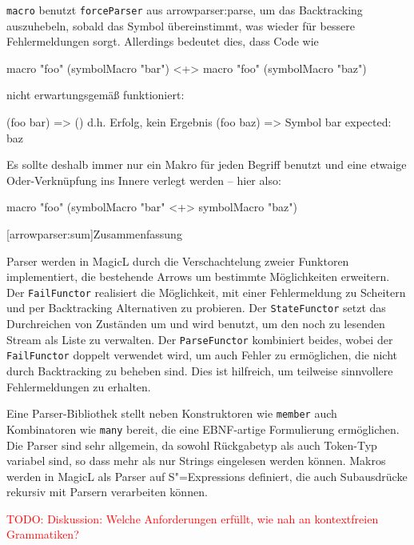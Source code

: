 \documentclass[11pt, a4paper, bibgerm]{scrbook}
\newenvironment{DIFnomarkup}{}{}
\newcommand\icode[1]{\lstinline?#1?}
\newcommand{\todo}[1]{
  \textcolor{red}{TODO: #1}
}
\newcommand\lsection{}
\newcommand\sref{}
\newcommand{\sexps}{S"=Expressions}
\begin{document}
\icode{macro} benutzt \icode{forceParser} aus
\sref{arrowparser:parse}, um das Backtracking auszuhebeln, sobald das
Symbol übereinstimmt, was wieder für bessere Fehlermeldungen
sorgt. Allerdings bedeutet dies, dass Code wie
\begin{DIFnomarkup}\begin{code}
macro "foo" (symbolMacro "bar") <+> macro "foo" (symbolMacro "baz")
\end{code}\end{DIFnomarkup}
nicht erwartungsgemäß funktioniert:
\begin{DIFnomarkup}\begin{code}
(foo bar)   => ()  d.h. Erfolg, kein Ergebnis
(foo baz)   => Symbol bar expected: baz
\end{code}\end{DIFnomarkup}
Es sollte deshalb immer nur ein Makro für jeden Begriff benutzt und
eine etwaige Oder-Verknüpfung ins Innere verlegt werden -- hier also:
\begin{DIFnomarkup}\begin{code}
macro "foo" (symbolMacro "bar" <+> symbolMacro "baz")
\end{code}\end{DIFnomarkup}

\lsection[arrowparser:sum]{Zusammenfassung}

Parser werden in MagicL durch die Verschachtelung zweier Funktoren
implementiert, die bestehende Arrows um bestimmte Möglichkeiten
erweitern. Der \icode{FailFunctor} realisiert die Möglichkeit, mit einer
Fehlermeldung zu Scheitern und per Backtracking Alternativen zu
probieren. Der \icode{StateFunctor} setzt das Durchreichen von Zuständen
um und wird benutzt, um den noch zu lesenden Stream als Liste zu
verwalten. Der \icode{ParseFunctor} kombiniert beides, wobei der
\icode{FailFunctor} doppelt verwendet wird, um auch Fehler zu
ermöglichen, die nicht durch Backtracking zu beheben sind. Dies ist
hilfreich, um teilweise sinnvollere Fehlermeldungen zu erhalten.

Eine Parser-Bibliothek stellt neben Konstruktoren wie \icode{member}
auch Kombinatoren wie \icode{many} bereit, die eine EBNF-artige
Formulierung ermöglichen. Die Parser sind sehr allgemein, da sowohl
Rückgabetyp als auch Token-Typ variabel sind, so dass mehr als nur
Strings eingelesen werden können. Makros werden in MagicL als Parser auf
\sexps{} definiert, die auch Subausdrücke rekursiv mit Parsern
verarbeiten können.

\todo{Diskussion: Welche Anforderungen erfüllt, wie nah an kontextfreien
Grammatiken?}
\end{document}
